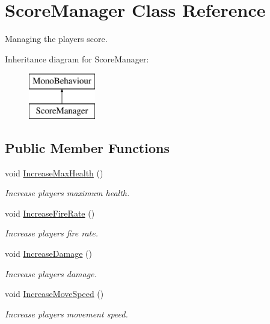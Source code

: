 \hypertarget{class_score_manager}{}\section{Score\+Manager Class Reference}
\label{class_score_manager}


Managing the player\textquotesingle{}s score.  


Inheritance diagram for Score\+Manager\+:\begin{figure}[H]
\begin{center}
\leavevmode
\includegraphics[height=2.000000cm]{class_score_manager}
\end{center}
\end{figure}
\subsection*{Public Member Functions}
\begin{DoxyCompactItemize}
\item 
void \mbox{\hyperlink{class_score_manager_ab2cb9d4f0f139ecb67b9c62cdb201554}{Increase\+Max\+Health}} ()
\begin{DoxyCompactList}\small\item\em Increase player\textquotesingle{}s maximum health. \end{DoxyCompactList}\item 
void \mbox{\hyperlink{class_score_manager_a0d2287104231446664cb40d541b120d0}{Increase\+Fire\+Rate}} ()
\begin{DoxyCompactList}\small\item\em Increase player\textquotesingle{}s fire rate. \end{DoxyCompactList}\item 
void \mbox{\hyperlink{class_score_manager_a641ee37dc7c0a9d95fb9ea960b10ea37}{Increase\+Damage}} ()
\begin{DoxyCompactList}\small\item\em Increase player\textquotesingle{}s damage. \end{DoxyCompactList}\item 
void \mbox{\hyperlink{class_score_manager_a8a366d34d7bdd899089e918f541b5de5}{Increase\+Move\+Speed}} ()
\begin{DoxyCompactList}\small\item\em Increase player\textquotesingle{}s movement speed. \end{DoxyCompactList}\end{DoxyCompactItemize}
